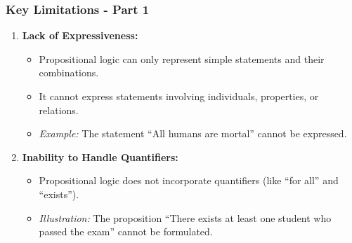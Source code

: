 \documentclass[aspectratio=169]{beamer}
\begin{document}
\begin{frame}[fragile]
    \frametitle{Key Limitations - Part 1}
    \begin{enumerate}
        \item \textbf{Lack of Expressiveness:}
        \begin{itemize}
            \item Propositional logic can only represent simple statements and their combinations.
            \item It cannot express statements involving individuals, properties, or relations.
            \item \textit{Example:} The statement ``All humans are mortal'' cannot be expressed.
        \end{itemize}
        
        \item \textbf{Inability to Handle Quantifiers:}
        \begin{itemize}
            \item Propositional logic does not incorporate quantifiers (like ``for all'' and ``exists'').
            \item \textit{Illustration:} The proposition ``There exists at least one student who passed the exam'' cannot be formulated.
        \end{itemize}
    \end{enumerate}
\end{frame}
\end{document}
